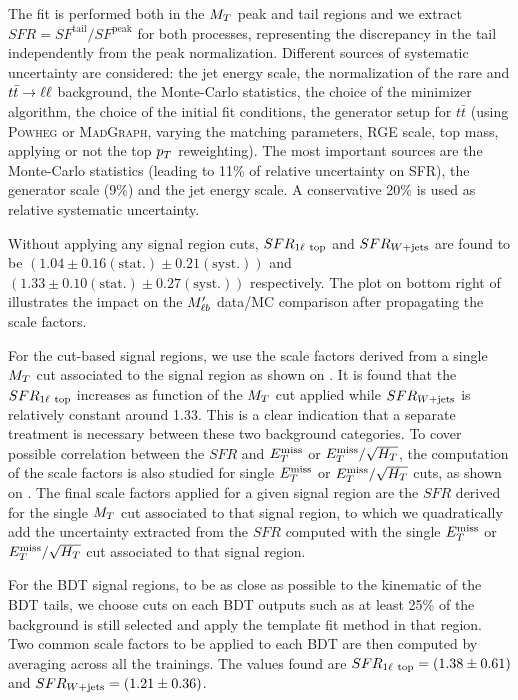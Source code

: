     The fit is
    performed both in the $M_T$ peak and tail regions and we extract $SFR = SF^{\text{tail}}
    / SF^{\text{peak}}$ for both processes, representing the discrepancy in the tail
    independently from the peak normalization. Different sources of systematic uncertainty
    are considered: the jet energy scale, the normalization of the rare and $t\bar{t} \rightarrow \ell \ell$ background, the
    Monte-Carlo statistics, the choice of the minimizer algorithm, the choice of the
    initial fit conditions, the generator setup for $t\bar{t}$ (using \textsc{Powheg} or
    \textsc{MadGraph}, varying the matching parameters, RGE scale, top mass, applying or
    not the top $p_T$ reweighting). The most important sources are the Monte-Carlo statistics
    (leading to 11\% of relative uncertainty on SFR), the generator scale (9\%) and the jet
    energy scale. A conservative 20\% is used as relative systematic uncertainty.

    Without applying any signal region cuts, $SFR_{1\ell~\text{top}}$ and $SFR_{\text{$W$+jets}}$ are found
    to be $(1.04 \pm 0.16 (\text{stat.}) \pm 0.21 (\text{syst.}))$ and $(1.33 \pm 0.10
    (\text{stat.}) \pm 0.27 (\text{syst.}) )$ respectively. The plot on bottom right
    of 
    illustrates the impact on the $M'_{\ell b}$ data/MC comparison after propagating the scale
    factors.

    For the cut-based signal regions, we
    use the scale factors derived from a single $M_T$ cut associated to the signal region
    as shown on . It is found that the $SFR_{1\ell~\text{top}}$
    increases as function of the $M_T$ cut applied while $SFR_{\text{$W$+jets}}$ is relatively constant
    around 1.33. This is a clear indication that a separate treatment is necessary between
    these two background categories. To cover possible correlation between the $SFR$ and
    $E_T^\text{miss}$ or $E_T^\text{miss}/\sqrt{H_T}$, the computation of the scale factors is also studied for
    single $E_T^\text{miss}$ or $E_T^\text{miss}/\sqrt{H_T}$ cuts, as shown on .
    The final scale factors applied for a given signal region are the $SFR$ derived for the
    single $M_T$ cut associated to that signal region, to which we quadratically add the
    uncertainty extracted from the $SFR$ computed with the single $E_T^\text{miss}$ or $E_T^\text{miss}/\sqrt{H_T}$
    cut associated to that signal region.

    For the BDT signal regions, to be as close as possible to the kinematic of the BDT tails,
    we choose cuts on each BDT outputs such as at least 25\% of the background is still
    selected and apply the template fit method in that region. Two common scale factors
    to be applied to each BDT are then computed by averaging across all the trainings.
    The values found are $SFR_{1\ell~\text{top}} = (1.38 \pm 0.61)$ and $SFR_{\text{$W$+jets}} = (1.21 \pm 0.36)$.

